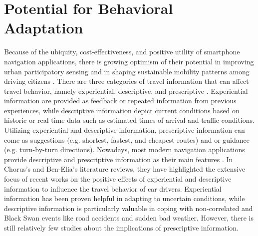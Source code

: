 \section{Potential for Behavioral Adaptation}
Because of the ubiquity, cost-effectiveness, and positive utility of smartphone navigation applications, there is growing optimism of their potential in improving urban participatory sensing \cite{Silva2013TrafficAlerts,Xie2015AnNetworks,Silva2016UsersOpportunities} and in shaping sustainable mobility patterns among driving citizens \cite{Ben-Elia2015ResponseReview,Attard2016TheSystems}. There are three categories of travel information that can affect travel behavior, namely experiential, descriptive, and prescriptive \cite{Ben-Elia2015ResponseReview}. Experiential information are provided as feedback or repeated information from previous experiences, while descriptive information depict current conditions based on historic or real-time data such as estimated times of arrival and traffic conditions. Utilizing experiential and descriptive information, prescriptive information can come as suggestions (e.g. shortest, fastest, and cheapest routes) and or guidance (e.g. turn-by-turn directions). Nowadays, most modern navigation applications provide descriptive and prescriptive information as their main features \cite{Sha2013SocialNavigation}. In Chorus's \cite{Chorus2006TravelReview} and Ben-Elia's \cite{Ben-Elia2015ResponseReview} literature reviews, they have highlighted the extensive focus of recent works on the positive effects of experiential and descriptive information to influence the travel behavior of car drivers. Experiential information has been proven helpful in adapting to uncertain conditions, while descriptive information is particularly valuable in coping with non-correlated and Black Swan events like road accidents and sudden bad weather. However, there is still relatively few studies about the implications of prescriptive information.

